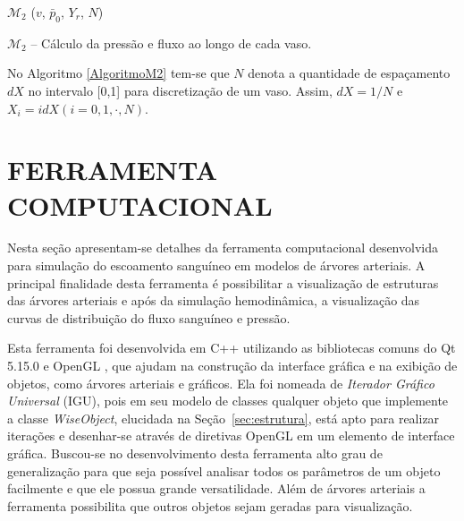 \documentclass[
        english,			
        brazil			        %
        ,<...>]{abntbibufjf}
\begin{document}
\begin{algorithm}[H]
$\mathcal{M}_2$ ($v$, $\bar{p}_0$, $Y_r$, $N$) \\
\caption{$\mathcal{M}_2$ -- Cálculo da pressão e fluxo ao longo de cada vaso.}
\label{AlgoritmoM2}
\end{algorithm}

No Algoritmo \ref{AlgoritmoM2} tem-se que $N$ denota a quantidade de espaçamento $dX$ no intervalo [0,1] para discretização de um vaso. Assim, $dX = 1/N$ e $X_i = i dX (i = 0, 1, \cdot, N)$.

\chapter{FERRAMENTA COMPUTACIONAL}\label{sec:ferramenta_computacional}

Nesta seção apresentam-se detalhes da ferramenta computacional desenvolvida para simulação do escoamento sanguíneo em modelos de árvores arteriais. A principal finalidade desta ferramenta é possibilitar a visualização de estruturas das árvores arteriais e após da simulação hemodinâmica,  a visualização das curvas de distribuição do fluxo sanguíneo e pressão.

Esta ferramenta foi desenvolvida em C++ utilizando as bibliotecas comuns do Qt 5.15.0 \cite{QTClasses} e OpenGL \cite{OpenGL}, que ajudam na construção da interface gráfica e na exibição de objetos, como árvores arteriais e gráficos. Ela foi nomeada de \textit{Iterador Gráfico Universal} (IGU), pois em seu modelo de classes qualquer objeto que implemente a classe \textit{WiseObject}, elucidada na Seção~\ref{sec:estrutura}, está apto para realizar iterações e desenhar-se através de diretivas OpenGL em um elemento de interface gráfica. Buscou-se no desenvolvimento desta ferramenta alto grau de generalização para que seja possível analisar todos os parâmetros de um objeto facilmente e que ele possua grande versatilidade. Além de árvores arteriais a ferramenta possibilita que outros objetos sejam geradas para visualização.
\end{document}
